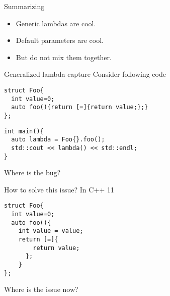 \documentclass[10pt]{beamer}
\begin{document}

\begin{frame}{Summarizing}
	\begin{itemize}[<+- |alert@+>]
	\item Generic lambdas are cool.
	\item Default parameters are cool.
	\item But do not mix them together.
	\end{itemize}
\end{frame}

\begin{frame}[fragile]{Generalized lambda capture}
	\centering Consider following code

	\begin{verbatim}
struct Foo{
  int value=0;
  auto foo(){return [=]{return value;};}
};
	\end{verbatim}

	\pause

	\begin{verbatim}
int main(){
  auto lambda = Foo{}.foo();
  std::cout << lambda() << std::endl;
}
	\end{verbatim}

	\pause

\centering \alert{Where is the bug?}

\end{frame}

\begin{frame}[fragile]{How to solve this issue?}
	\centering \alert{In C++ 11}

	\begin{verbatim}
struct Foo{
  int value=0;
  auto foo(){
    int value = value;
    return [=]{
        return value;
      };
    }
};
	\end{verbatim}

	\pause
	\vfill
	\centering \alert{Where is the issue now?} 
\end{frame}
\end{document}
